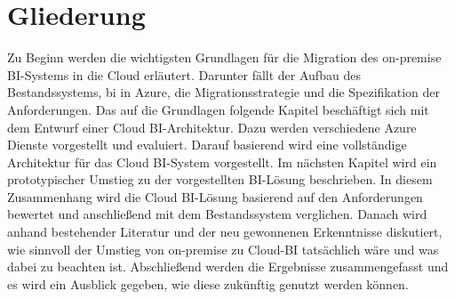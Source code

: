 \section{Gliederung} \label{sec:intro:struktur}
Zu Beginn werden die wichtigsten Grundlagen für die Migration des on-premise BI-Systems in die Cloud erläutert. Darunter fällt der Aufbau des Bestandssystems, \ac{bi} in Azure, die Migrationsstrategie und die Spezifikation der Anforderungen. Das auf die Grundlagen folgende Kapitel beschäftigt sich mit dem Entwurf einer Cloud BI-Architektur. Dazu werden verschiedene Azure Dienste vorgestellt und evaluiert. Darauf basierend wird eine vollständige Architektur für das Cloud BI-System vorgestellt. Im nächsten Kapitel wird ein prototypischer Umstieg zu der vorgestellten BI-Lösung beschrieben. In diesem Zusammenhang wird die Cloud BI-Lösung basierend auf den Anforderungen bewertet und anschließend mit dem Bestandssystem verglichen. Danach wird anhand bestehender Literatur und der neu gewonnenen Erkenntnisse diskutiert, wie sinnvoll der Umstieg von on-premise zu Cloud-BI tatsächlich wäre und was dabei zu beachten ist. Abschließend werden die Ergebnisse zusammengefasst und es wird ein Ausblick gegeben, wie diese zukünftig genutzt werden können.